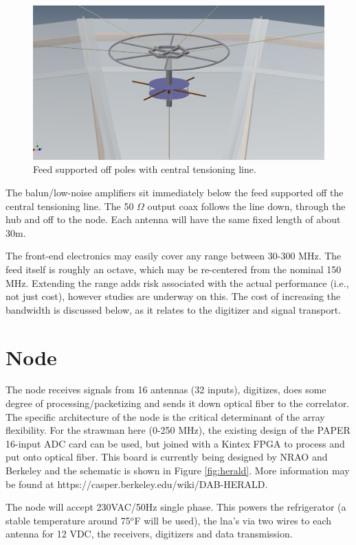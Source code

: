 \documentclass[11pt]{article}
\begin{document}
\begin{figure}[H]
\centering
\includegraphics[width=\textwidth]{frontend.png}
\caption{Feed supported off poles with central tensioning line.}
\label{fig:frontend}
\end{figure}

The balun/low-noise amplifiers sit immediately below the feed supported off the central tensioning line.  The 50 $\Omega$ output coax follows the line down, through the hub and off to the node.  Each antenna will have the same fixed length of about 30m.

The front-end electronics may easily cover any range between 30-300 MHz.  The feed itself is roughly an octave, which may be re-centered from the nominal 150 MHz.   Extending the range adds risk associated with the actual performance (i.e., not just cost), however studies are underway on this.  The cost of increasing the bandwidth is discussed below, as it relates to the digitizer and signal transport.

\section{Node}
The node receives signals from 16 antennas (32 inputs), digitizes, does some degree of processing/packetizing and sends it down optical fiber to the correlator.  The specific architecture of the node is the critical determinant of the array flexibility.  For the strawman here (0-250 MHz), the existing design of the PAPER 16-input ADC card can be used, but joined with a Kintex FPGA to process and put onto optical fiber.   This board is currently being designed by NRAO and Berkeley and the schematic is shown in Figure \ref{fig:herald}.  More information may be found at https://casper.berkeley.edu/wiki/DAB-HERALD.

The node will accept 230VAC/50Hz single phase.  This powers the refrigerator (a stable temperature around 75$^o$F will be used), the lna's via two wires to each antenna for 12 VDC, the receivers, digitizers and data transmission.
\end{document}
